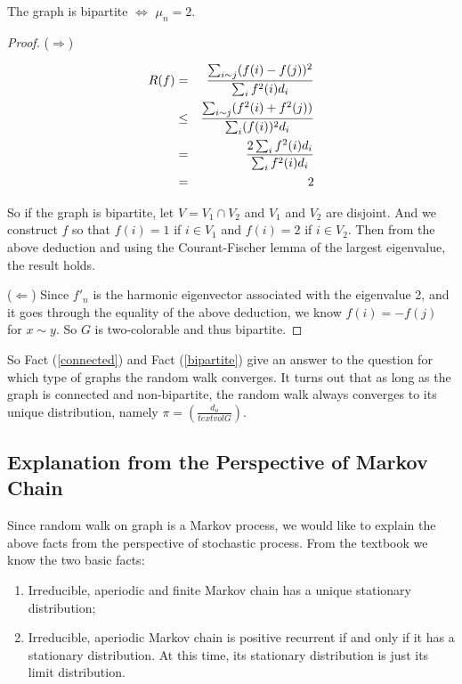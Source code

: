 \begin{fact} \label{bipartite}
The graph is bipartite $\Leftrightarrow$ $\mu_n=2$.
\end{fact}

\begin{proof}
($\Rightarrow$)

\begin{eqnarray*}
R(f) & = & \frac{\sum_{i\sim
j} (f(i)-f(j))^2}{\sum_i f^2(i) d_i} \\
& \leq & {{\sum_{i\sim j} (f^2(i)+f^2(j))}\over{\sum_i (f(i))^2 d_i}} \\
& = & \frac{2\sum_i f^2(i) d_i}{\sum_i f^2(i) d_i} \\
& = & 2
\end{eqnarray*}

So if the graph is bipartite, let $V=V_1 \cap V_2$ and $V_1$ and
$V_2$ are disjoint. And we construct $f$ so that $f(i)=1$ if $i\in
V_1$ and $f(i)=2$ if $i\in V_2$. Then from the above deduction and
using the Courant-Fischer lemma of the largest eigenvalue, the
result holds.

($\Leftarrow$) Since $f'_n$ is the harmonic eigenvector associated
with the eigenvalue 2, and it goes through the equality of the above
deduction, we know $f(i)=-f(j)$ for $x\sim y$. So $G$ is
two-colorable and thus bipartite.
\end{proof}

So Fact (\ref{connected}) and Fact (\ref{bipartite}) give an answer
to the question for which type of graphs the random walk converges.
It turns out that as long as the graph is connected and
non-bipartite, the random walk always converges to its unique
distribution, namely $\pi=(\frac{d_u}{text{vol}G})$.

\subsection{Explanation from the Perspective of Markov Chain}
Since random walk on graph is a Markov process, we would like to
explain the above facts from the perspective of stochastic process.
From the textbook we know the two basic facts:

\begin{enumerate}
\item Irreducible, aperiodic and finite Markov chain has a unique
stationary distribution;
\item Irreducible, aperiodic Markov chain is positive recurrent if
and only if it has a stationary distribution. At this time, its
stationary distribution is just its limit distribution.
\end{enumerate}

